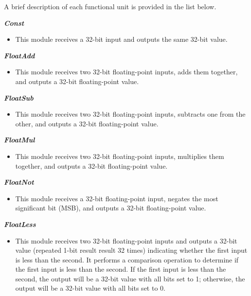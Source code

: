 \documentclass{article}
\begin{document}
A brief description of each functional unit is provided in the list below.

\vspace{0.5cm}

\textbf{\textit{Const}}
\begin{itemize}
\item This module receives a 32-bit input and outputs the same 32-bit value.
\end{itemize}

\vspace{0.5cm}

\textbf{\textit{FloatAdd}}
\begin{itemize}
\item This module receives two 32-bit floating-point inputs, adds them together, and outputs a 32-bit floating-point value.
\end{itemize}

\vspace{0.5cm}

\textbf{\textit{FloatSub}}
\begin{itemize}
\item This module receives two 32-bit floating-point inputs, subtracts one from the other, and outputs a 32-bit floating-point value.
\end{itemize}

\vspace{0.5cm}

\textbf{\textit{FloatMul}}
\begin{itemize}
\item  This module receives two 32-bit floating-point inputs, multiplies them together, and outputs a 32-bit floating-point value.
\end{itemize}

\vspace{0.5cm}

\textbf{\textit{FloatNot}}
\begin{itemize}
\item  This module receives a 32-bit floating-point input, negates the most significant bit (MSB), and outputs a 32-bit floating-point value.
\end{itemize}

\vspace{0.5cm}

\textbf{\textit{FloatLess}}
\begin{itemize}
\item  This module receives two 32-bit floating-point inputs and outputs a 32-bit value (repeated 1-bit result result 32 times) indicating whether the first input is less than the second. It performs a comparison operation to determine if the first input is less than the second.
If the first input is less than the second, the output will be a 32-bit value with all bits set to 1; otherwise, the output will be a 32-bit value with all bits set to 0.
\end{itemize}
\end{document}
